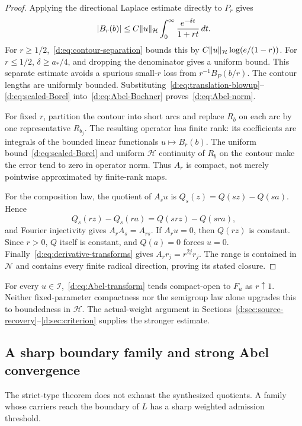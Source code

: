 \documentclass[11pt,a4paper]{article}
\numberwithin{equation}{section}
\theoremstyle{definition}\newtheorem{definition}[theorem]{Definition}
\theoremstyle{remark}\newtheorem{remark}[theorem]{Remark}
\newcommand{\Hh}{\mathcal H}\newcommand{\Hw}{\mathcal H}
\newcommand{\Nn}{\mathcal N}\newcommand{\Ii}{\mathcal I}\newcommand{\Zz}{\mathcal Z}
\begin{document}
\begin{proof}
Applying the directional Laplace estimate directly to $P_r$ gives
\begin{equation}\label{d:eq:scaled-Borel}
 |B_r(b)|\le C\norm{u}_{\Hh}
       \int_0^\infty\frac{e^{-\delta t}}{1+rt}\,dt.
\end{equation}
For $r\ge1/2$,~\eqref{d:eq:contour-separation} bounds this by
$C\norm{u}_{\Hh}\log(e/(1-r))$. For $r\le1/2$, $\delta\ge a_*/4$, and dropping the denominator gives a uniform bound. This separate estimate avoids a spurious small-$r$ loss from $r^{-1}B_P(b/r)$. The contour lengths are uniformly bounded. Substituting~\eqref{d:eq:translation-blowup}--\eqref{d:eq:scaled-Borel} into~\eqref{d:eq:Abel-Bochner} proves~\eqref{d:eq:Abel-norm}.

For fixed $r$, partition the contour into short arcs and replace $R_b$ on each arc by one representative $R_{b_j}$. The resulting operator has finite rank: its coefficients are integrals of the bounded linear functionals $u\mapsto B_r(b)$. The uniform bound~\eqref{d:eq:scaled-Borel} and uniform $\Hh$ continuity of $R_b$ on the contour make the error tend to zero in operator norm. Thus $A_r$ is compact, not merely pointwise approximated by finite-rank maps.

For the composition law, the quotient of $A_su$ is
$Q_s(z)=Q(sz)-Q(sa)$. Hence
\[
 Q_s(rz)-Q_s(ra)=Q(sr z)-Q(sr a),
\]
and Fourier injectivity gives $A_rA_s=A_{rs}$. If $A_ru=0$, then $Q(rz)$ is constant. Since $r>0$, $Q$ itself is constant, and $Q(a)=0$ forces $u=0$. Finally~\eqref{d:eq:derivative-transforms} gives $A_rr_j=r^{2j}r_j$. The range is contained in $\Nn$ and contains every finite radical direction, proving its stated closure.
\end{proof}

For every $u\in\Ii$,~\eqref{d:eq:Abel-transform} tends compact-open to $F_u$ as $r\uparrow1$. Neither fixed-parameter compactness nor the semigroup law alone upgrades this to boundedness in $\Hh$. The actual-weight argument in Sections~\ref{d:sec:source-recovery}--\ref{d:sec:criterion} supplies the stronger estimate.

\subsection{A sharp boundary family and strong Abel convergence}\label{d:sec:boundary-family}

The strict-type theorem does not exhaust the synthesized quotients. A family whose carriers reach the boundary of $L$ has a sharp weighted admission threshold.
\end{document}
